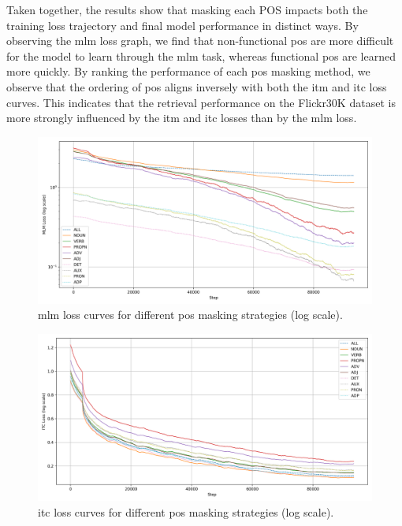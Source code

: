 Taken together, the results show that masking each POS impacts both the training loss trajectory and final model performance in distinct ways.  
By observing the \acrshort{mlm} loss graph, we find that non-functional \acrshort{pos} are more difficult for the model to learn through the \acrshort{mlm} task, whereas functional \acrshort{pos} are learned more quickly.
By ranking the performance of each \acrshort{pos} masking method, we observe that the ordering of \acrshort{pos} aligns inversely with both the \acrshort{itm} and \acrshort{itc} loss curves.  
This indicates that the retrieval performance on the Flickr30K dataset is more strongly influenced by the \acrshort{itm} and \acrshort{itc} losses than by the \acrshort{mlm} loss.

\begin{figure}[h]
    \caption{\acrshort{mlm} loss curves for different \acrshort{pos} masking strategies (log scale).}
    \label{fig:mlm_loss_pretrain}
    \begin{center}
        \includegraphics[width=1\textwidth]{Images/graph/mlm.png}
    \end{center}
\end{figure}

\begin{figure}[h]
    \caption{\acrshort{itc} loss curves for different \acrshort{pos} masking strategies (log scale).}
    \label{fig:itc_loss_pretrain}
    \begin{center}
        \includegraphics[width=1\textwidth]{Images/graph/itc.png}
    \end{center}
\end{figure}

